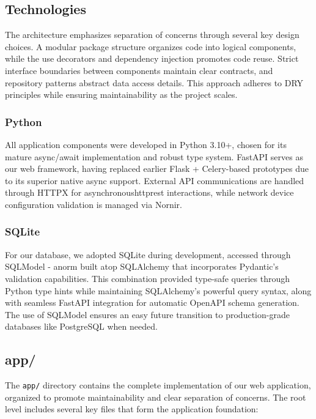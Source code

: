     \subsection{Technologies}

        The architecture emphasizes separation of concerns through several key design choices. A modular package structure 
        organizes code into logical components, while the use decorators and dependency injection promotes code reuse. 
        Strict interface boundaries between components maintain clear contracts, and repository patterns abstract data 
        access details. This approach adheres to DRY principles while ensuring maintainability as the project scales.
        
        \subsubsection{Python}
            All application components were developed in Python 3.10+, chosen for its mature async/await implementation and 
            robust type system. FastAPI serves as our web framework, having replaced earlier Flask + Celery-based prototypes 
            due to its superior native async support. External API communications are handled through HTTPX for 
            asynchronous\ac{http}\ac{rest} interactions, while network device configuration validation is managed via Nornir.

        \subsubsection{SQLite}
            For our database, we adopted SQLite during development, accessed through SQLModel - an\ac{orm} built atop SQLAlchemy 
            that incorporates Pydantic's validation capabilities. This combination provided type-safe queries through Python type 
            hints while maintaining SQLAlchemy's powerful query syntax, along with seamless FastAPI integration for automatic 
            OpenAPI schema generation. The use of SQLModel ensures an easy future transition to production-grade databases 
            like PostgreSQL when needed.


    \subsection{app/}

        The \texttt{app/} directory contains the complete implementation of our web application, organized to promote 
        maintainability and clear separation of concerns. The root level includes several key files that form the 
        application foundation:

